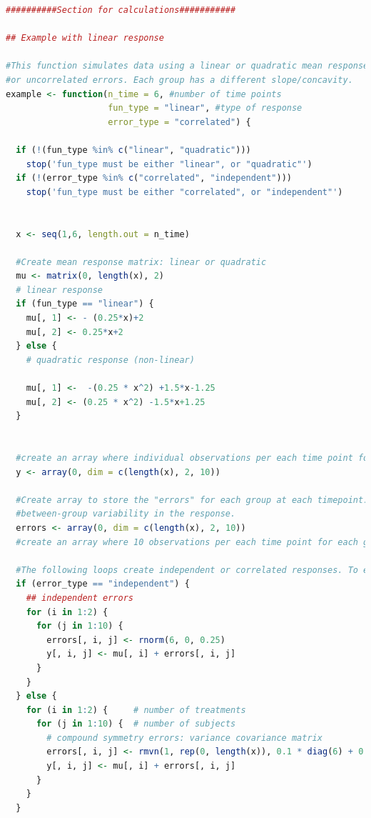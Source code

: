 \documentclass[
]{article}
\begin{document}
\begin{lstlisting}[language=R]
##########Section for calculations###########

## Example with linear response

#This function simulates data using a linear or quadratic mean response and each with correlated
#or uncorrelated errors. Each group has a different slope/concavity.
example <- function(n_time = 6, #number of time points
                    fun_type = "linear", #type of response
                    error_type = "correlated") {
  
  if (!(fun_type %in% c("linear", "quadratic")))
    stop('fun_type must be either "linear", or "quadratic"')
  if (!(error_type %in% c("correlated", "independent")))
    stop('fun_type must be either "correlated", or "independent"')
  
  
  x <- seq(1,6, length.out = n_time)
  
  #Create mean response matrix: linear or quadratic
  mu <- matrix(0, length(x), 2)
  # linear response
  if (fun_type == "linear") {
    mu[, 1] <- - (0.25*x)+2  
    mu[, 2] <- 0.25*x+2
  } else {
    # quadratic response (non-linear)
    
    mu[, 1] <-  -(0.25 * x^2) +1.5*x-1.25
    mu[, 2] <- (0.25 * x^2) -1.5*x+1.25
  }
  
 
  #create an array where individual observations per each time point for each group are to be stored. Currently using 10 observations per timepoint
  y <- array(0, dim = c(length(x), 2, 10))
  
  #Create array to store the "errors" for each group at each timepoint. The "errors" are the 
  #between-group variability in the response.
  errors <- array(0, dim = c(length(x), 2, 10))
  #create an array where 10 observations per each time point for each group are to be stored
  
  #The following loops create independent or correlated responses. To each value of mu (mean response per group) a randomly generated error (correlated or uncorrelated) is added and thus the individual response is created.
  if (error_type == "independent") {
    ## independent errors
    for (i in 1:2) {
      for (j in 1:10) {
        errors[, i, j] <- rnorm(6, 0, 0.25)
        y[, i, j] <- mu[, i] + errors[, i, j]
      }
    }
  } else {
    for (i in 1:2) {     # number of treatments
      for (j in 1:10) {  # number of subjects
        # compound symmetry errors: variance covariance matrix
        errors[, i, j] <- rmvn(1, rep(0, length(x)), 0.1 * diag(6) + 0.25 * matrix(1, 6, 6))
        y[, i, j] <- mu[, i] + errors[, i, j]
      }
    }
  }    
  

\end{lstlisting}
\end{document}
